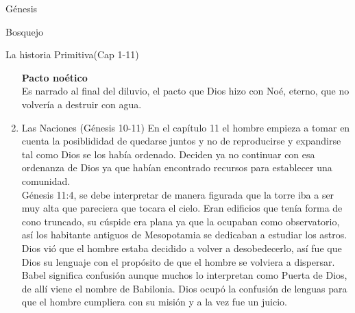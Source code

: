 \begin{section}{Génesis}
\begin{subsection}{Bosquejo}
\begin{subsubsection}{La historia Primitiva(Cap 1-11)}
\begin{enumerate}
\textbf{Pacto noético}\\
Es narrado al final del diluvio, el pacto que Dios hizo con Noé, eterno,  que no volvería a destruir con agua.
\item Las Naciones (Génesis 10-11)
En el capítulo 11 el hombre empieza a tomar en cuenta la posiblididad de quedarse juntos y no de reproducirse y expandirse tal como Dios se los había ordenado. Deciden ya no continuar con esa ordenanza de Dios ya que habían encontrado recursos para establecer una comunidad.\\
Génesis 11:4, se debe interpretar de manera figurada que la torre iba a ser muy alta  que pareciera que tocara el cielo. Eran edificios que tenía forma de cono truncado, su cúspide era plana ya que la ocupaban como observatorio, así los habitante antiguos de Mesopotamia se dedicaban a estudiar los astros.\\
Dios vió que el hombre estaba decidido a volver a desobedecerlo, así fue que Dios su lenguaje con el propósito de que el hombre se volviera a dispersar. Babel significa confusión aunque muchos lo interpretan como Puerta de Dios, de allí viene el nombre de Babilonia. Dios ocupó la confusión de lenguas para que el hombre cumpliera con su misión y a la vez fue un juicio.

	\end{enumerate}


\end{subsubsection}
\end{subsection}
\end{section}
